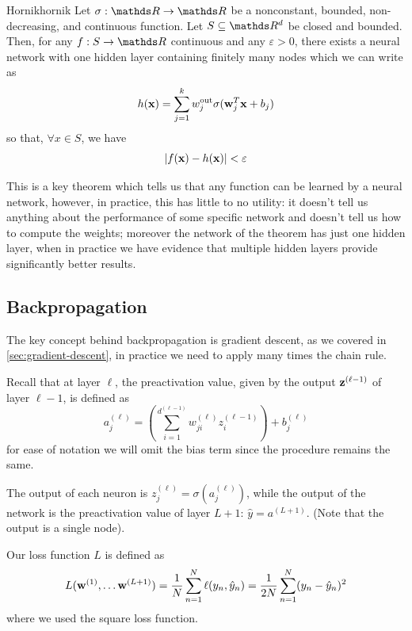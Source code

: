 \documentclass[12pt]{extarticle}
\renewcommand{\vec}[1]{\bvec{#1}}
\begin{document}
\begin{theorem}{Hornik}{hornik}
	Let $\sigma: \R \to \R$ be a nonconstant, bounded, non-decreasing, and continuous function.
	Let $S \subseteq \R^d$ be closed and bounded.
	Then, for any $f: S \to \R$ continuous and any $\varepsilon > 0$, there exists a neural network
	with one hidden layer containing finitely many nodes which we can write as
	\begin{equation}
		h(\vec x) = \sum_{j = 1}^k w^\text{out}_j \sigma(\vec w_j^T \vec x + b_j)
	\end{equation}
	so that, $\forall x \in S$, we have
	\begin{equation}
		\abs{f(\vec x) - h(\vec x)} < \varepsilon
	\end{equation}
\end{theorem}

This is a key theorem which tells us that any function can be learned by a neural network, however,
in practice, this has little to no utility: it doesn't tell us anything about the performance of
some specific network and doesn't tell us how to compute the weights; moreover the network of the
theorem has just one hidden layer, when in practice we have evidence that multiple hidden layers
provide significantly better results.

\subsection{Backpropagation}

The key concept behind backpropagation is gradient descent, as we covered in
\cref{sec:gradient-descent}, in practice we need to apply many times the chain rule.

Recall that at layer $\ell$, the preactivation value, given by the output $\vec z^{(\ell - 1)}$ of
layer $\ell - 1$, is defined as
\begin{equation}
	a^{(\ell)}_j = \left( \sum_{i = 1}^{d^{(\ell - 1)}} w_{ji}^{(\ell)} z_i^{(\ell - 1)}\right) +
	b_j^{(\ell)}
\end{equation}
for ease of notation we will omit the bias term since the procedure remains the same.

The output of each neuron is $z_j^{(\ell)} = \sigma(a_j^{(\ell)})$, while the output of the network
is the preactivation value of layer $L + 1$: $\hat{y} = a^{(L+1)}$.
(Note that the output is a single node).

Our loss function $L$ is defined as
\begin{equation}
	L(\vec w^{(1)}, \dots \vec w^{(L+1)}) = \frac{1}{N} \sum_{n = 1}^N \ell(y_n, \hat y_n)
	= \frac{1}{2N} \sum_{n = 1}^N (y_n - \hat y_n)^2
\end{equation}
where we used the square loss function.
\end{document}
